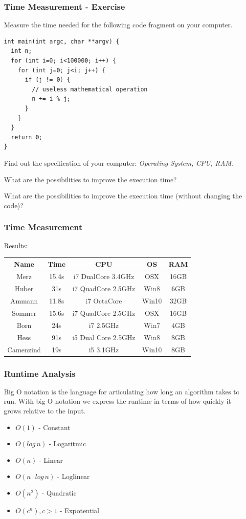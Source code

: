 \begin{frame}[fragile]
\frametitle{Time Measurement - Exercise}
{\tiny
\begin{exercise}
Measure the time needed for the following code fragment on your computer.
\begin{lstlisting}
int main(int argc, char **argv) {
  int n;
  for (int i=0; i<100000; i++) {
    for (int j=0; j<i; j++) {
      if (j != 0) {
        // useless mathematical operation
        n += i % j;
      }
    }
  }
  return 0;
}
\end{lstlisting}
\end{exercise}
\begin{exercise}
Find out the specification of your computer: \emph{Operating System, CPU, RAM}.
\end{exercise}
\begin{exercise}
What are the possibilities to improve the execution time?
\end{exercise}
\begin{exercise}
What are the possibilities to improve the execution time (without changing the code)?
\end{exercise}
}
\end{frame}

\begin{frame}[fragile]
\frametitle{Time Measurement}
Results:\\
\vspace{3mm}
\begin{tabular}{c|c|c|c|c}
Name & Time & CPU & OS & RAM\\
\hline
Merz & 15.4s & i7 DualCore 3.4GHz & OSX & 16GB\\
Huber & 31s & i7 QuadCore 2.5GHz & Win8 & 6GB\\
Ammann & 11.8s & i7 OctaCore & Win10 & 32GB\\
Sommer & 15.6s & i7 QuadCore 2.5GHz & OSX & 16GB\\
Born & 24s & i7 2.5GHz & Win7 & 4GB\\
Hess & 91s & i5 Dual Core 2.5GHz &  Win8 & 8GB\\
Camenzind & 19s & i5 3.1GHz & Win10 & 8GB	
\end{tabular}
\end{frame}

\begin{frame}[fragile]
\frametitle{Runtime Analysis}
Big O notation is the language for articulating how long an algorithm takes to run.
With big O notation we express the runtime in terms of how quickly it grows relative to the input.

\begin{itemize}
\item $O(1)$ - Constant
\item $O(log \, n)$ - Logaritmic
\item $O(n)$ - Linear
\item $O(n \cdot log \, n)$ - Loglinear
\item $O(n^2)$ - Quadratic
\item $O(c^n), c > 1$ - Expotential
\end{itemize}

\end{frame}

